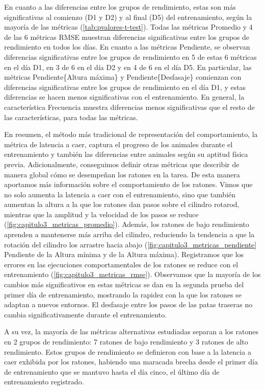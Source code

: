 En cuanto a las diferencias entre los grupos de rendimiento, estas son más significativas al comienzo (D1 y D2) y al final (D5) del entrenamiento, según la mayoría de las métricas (\autoref{tab:pvalores-t-test}). Todas las métricas Promedio y 4 de las 6 métricas RMSE muestran diferencias significativas entre los grupos de rendimiento en todos los días. En cuanto a las métricas Pendiente, se observan diferencias significativas entre los grupos de rendimiento en 5 de estas 6 métricas en el día D1, en 3 de 6 en el día D2 y en 4 de 6 en el día D5. En particular, las métricas Pendiente\{Altura máxima\} y Pendiente\{Desfasaje\} comienzan con diferencias significativas entre los grupos de rendimiento en el día D1, y estas diferencias se hacen menos significativas con el entrenamiento. En general, la característica Frecuencia muestra diferencias menos significativas que el resto de las características, para todas las métricas.

En resumen, el método más tradicional de representación del comportamiento, la métrica de latencia a caer, captura el progreso de los animales durante el entrenamiento y también las diferencias entre animales según su aptitud física previa. Adicionalmente, conseguimos definir otras métricas que describir de manera global cómo se desempeñan los ratones en la tarea. De esta manera aportamos más información sobre el comportamiento de los ratones. Vimos que no solo aumenta la latencia a caer con el entrenamiento, sino que también aumentan la altura a la que los ratones dan pasos sobre el cilindro rotarod, mientras que la amplitud y la velocidad de los pasos se reduce (\autoref{fig:capitulo3_metricas_promedio}). Además, los ratones de bajo rendimiento aprenden a mantenerse más arriba del cilindro, reduciendo la tendencia a que la rotación del cilindro los arrastre hacia abajo (\autoref{fig:capitulo3_metricas_pendiente} Pendiente de la Altura mínima y de la Altura máxima). Registramos que los errores en las ejecuciones comportamentales de los ratones se reduce con el entrenamiento (\autoref{fig:capitulo3_metricas_rmse}). Observamos que la mayoría de los cambios más significativos en estas métricas se dan en la segunda prueba del primer día de entrenamiento, mostrando la rapidez con la que los ratones se adaptan a nuevos entornos. El desfasaje entre los pasos de las patas traseras no cambia significativamente durante el entrenamiento.

A su vez, la mayoría de las métricas alternativas estudiadas separan a los ratones en 2 grupos de rendimiento: 7 ratones de bajo rendimiento y 3 ratones de alto rendimiento. Estos grupos de rendimiento se definieron con base a la latencia a caer exhibida por los ratones, habiendo una maracada brecha desde el primer día de entrenamiento que se mantuvo hasta el día cinco, el último día de entrenamiento registrado.

